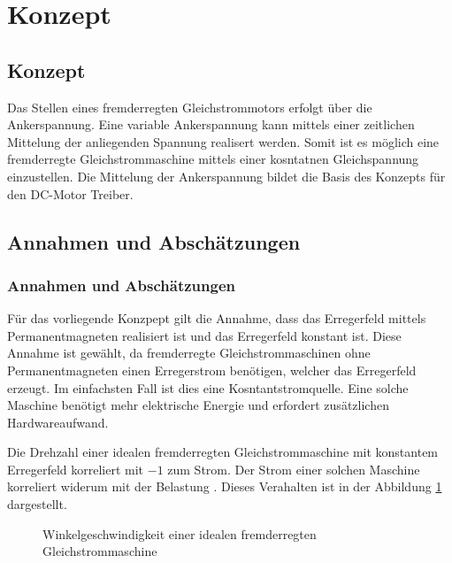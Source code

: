 \ifSTANDALONE
\section{Konzept}
\fi
\ifEMBED
\subsection{Konzept}
\fi

Das Stellen eines fremderregten Gleichstrommotors erfolgt über die
Ankerspannung. Eine variable Ankerspannung kann mittels einer 
zeitlichen Mittelung der anliegenden Spannung realisert werden. Somit
ist es möglich eine fremderregte Gleichstrommaschine mittels einer
kosntatnen Gleichspannung einzustellen. Die Mittelung der Ankerspannung
bildet die Basis des Konzepts für den DC-Motor Treiber.

\ifSTANDALONE
\subsection{Annahmen und Abschätzungen}\label{sec:annahmen}
\fi
\ifEMBED
\subsubsection{Annahmen und Abschätzungen}\label{sec:annahmen}
\fi
Für das vorliegende Konzpept gilt die Annahme, dass das Erregerfeld mittels
Permanentmagneten realisiert ist und das Erregerfeld konstant ist. Diese
Annahme ist gewählt, da fremderregte Gleichstrommaschinen ohne
Permanentmagneten einen Erregerstrom benötigen, welcher das Erregerfeld
erzeugt. Im einfachsten Fall ist dies eine Kosntantstromquelle. Eine solche
Maschine benötigt mehr elektrische Energie und erfordert zusätzlichen
Hardwareaufwand.

Die Drehzahl einer idealen fremderregten Gleichstrommaschine mit konstantem
Erregerfeld korreliert mit $-1$ zum Strom. Der Strom einer solchen Maschine
korreliert widerum mit der Belastung \cite[p.163]{smps}. Dieses Verahalten ist in
der Abbildung \ref{fig:ideal-dc-curve} dargestellt.

\begin{figure}[h!]
	\centering
	\caption{Winkelgeschwindigkeit einer idealen fremderregten 
		Gleichstrommaschine}
	\label{fig:ideal-dc-curve}
\end{figure}

